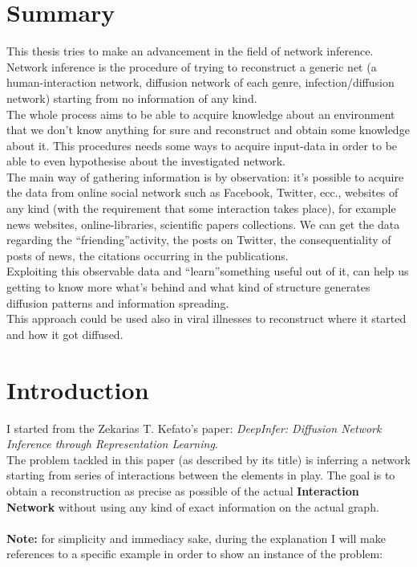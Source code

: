 \documentclass{article}
\begin{document}
	\section{Summary}
	This thesis tries to make an advancement in the field of network inference. Network inference is the procedure of trying to reconstruct a generic net (a human-interaction network, diffusion network of each genre, infection/diffusion network) starting from no information of any kind.\\
	The whole process aims to be able to acquire knowledge about an environment that we don't know anything for sure and reconstruct and obtain some knowledge about it. This procedures needs some ways to acquire input-data in order to be able to even hypothesise about the investigated network.\\
	The main way of gathering information is by observation: it's possible to acquire the data from online social network such as Facebook, Twitter, ecc., websites of any kind (with the requirement that some interaction takes place), for example news websites, online-libraries, scientific papers collections. We can get the data regarding the \textquotedblleft friending\textquotedblright activity, the posts on Twitter, the consequentiality of posts of news, the citations occurring in the publications.\\
	Exploiting this observable data and \textquotedblleft learn\textquotedblright something useful out of it, can help us getting to know more what's behind and what kind of structure generates diffusion patterns and information spreading.\\
	This approach could be used also in viral illnesses to reconstruct where it started and how it got diffused.
	\newpage
	\section{Introduction} 
		I started from the Zekarias	T. Kefato's paper: \textit{DeepInfer: Diffusion Network Inference through Representation Learning}.\\
		The problem tackled in this paper (as described by its title) is inferring a network starting from series of interactions between the elements in play.
		The goal is to obtain a reconstruction as precise as possible of the actual \textbf{Interaction Network} without using any kind of exact information on the actual graph.\\ 
		\\
		\textbf{Note:} for simplicity and immediacy sake, during the explanation I will make references to a specific example in order to show an instance of the problem:\\
		
\end{document}
